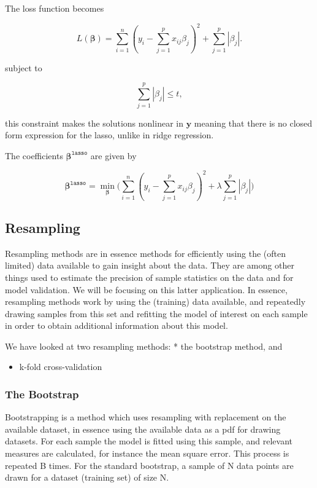 \documentclass[11pt]{article}
\providecommand{\tightlist}{%
      \setlength{\itemsep}{0pt}\setlength{\parskip}{0pt}}
\begin{document}
The loss function becomes

\[
L(\boldsymbol{\beta})=\sum_{i=1}^{n}(y_i-\sum_{j=1}^{p}x_{ij}\beta_j)^2+\sum_{j=1}^{p}|\beta_j|.
\]

subject to

\[
\sum_{j=1}^{p} |\beta_j| \leq t,
\]

this constraint makes the solutions nonlinear in \(\boldsymbol{y}\)
meaning that there is no closed form expression for the lasso, unlike in
ridge regression.

The coefficients \(\boldsymbol{\beta^{\texttt{lasso}}}\) are given by

\[
\boldsymbol{\beta^{\texttt{lasso}}} = {\displaystyle \min_{\boldsymbol{\beta}}}\bigg( \sum_{i=1}^{n}(y_i-\sum_{j=1}^{p}x_{ij}\beta_j)^2+\lambda\sum_{j=1}^{p}|\beta_j| \bigg)
\]

    \hypertarget{resampling}{%
\subsection{Resampling}\label{resampling}}

Resampling methods are in essence methods for efficiently using the
(often limited) data available to gain insight about the data. They are
among other things used to estimate the precision of sample statistics
on the data and for model validation. We will be focusing on this latter
application. In essence, resampling methods work by using the (training)
data available, and repeatedly drawing samples from this set and
refitting the model of interest on each sample in order to obtain
additional information about this model.

We have looked at two resampling methods: * the bootstrap method, and

\begin{itemize}
\tightlist
\item
  k-fold cross-validation
\end{itemize}

\hypertarget{the-bootstrap}{%
\subsubsection{The Bootstrap}\label{the-bootstrap}}

Bootstrapping is a method which uses resampling with replacement on the
available dataset, in essence using the available data as a pdf for
drawing datasets. For each sample the model is fitted using this sample,
and relevant measures are calculated, for instance the mean square
error. This process is repeated B times. For the standard bootstrap, a
sample of N data points are drawn for a dataset (training set) of size
N.
\end{document}
